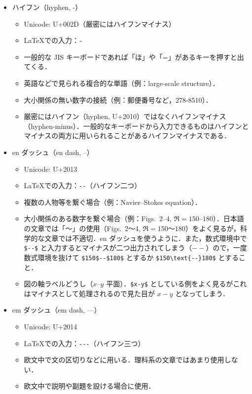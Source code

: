 \begin{itemize}
    \item ハイフン（hyphen, -）
    \begin{itemize}
        \item Unicode: U+002D（厳密にはハイフンマイナス）
        \item \LaTeX での入力：\verb|-|
        \item 一般的な JIS キーボードであれば「ほ」や「=」があるキーを押すと出てくる．
        \item 英語などで見られる複合的な単語（例：large-scale structure）．
        \item 大小関係の無い数字の接続（例：郵便番号など，278-8510）．
        \item 厳密にはハイフン（hyphen, U+2010）ではなくハイフンマイナス（hyphen-minus）．一般的なキーボードから入力できるものはハイフンとマイナスの両方に用いられることがあるハイフンマイナスである．
    \end{itemize}
    \item en ダッシュ（en dash, --）
    \begin{itemize}
        \item Unicode: U+2013
        \item \LaTeX での入力：\verb|--|（ハイフン二つ）
        \item 複数の人物等を繋ぐ場合（例：Navier--Stokes equation）．
        \item 大小関係のある数字を繋ぐ場合（例：Figs.~2--4, $\Re = 150$--$180$）．日本語の文章では「～」の使用（Figs.~2～4, $\Re = 150$～$180$）をよく見るが，科学的な文章では不適切．en ダッシュを使うように．また，数式環境中で \verb|$--$| と入力するとマイナスが二つ出力されてしまう（$--$）ので，一度数式環境を抜けて \verb|$150$--$180$| とするか \verb|$150\text{--}180$| とすること．
        \item 図の軸ラベルどうし（$x$--$y$ 平面）．\verb|$x-y$| としている例をよく見るがこれはマイナスとして処理されるので見た目が $x-y$ となってしまう．
    \end{itemize}
    \item em ダッシュ（em dash, ---）
    \begin{itemize}
        \item Unicode: U+2014
        \item \LaTeX での入力：\verb|---|（ハイフン三つ）
        \item 欧文中で文の区切りなどに用いる．理科系の文章ではあまり使用しない．
        \item 欧文中で説明や副題を設ける場合に使用．

\end{itemize}
\end{itemize}
